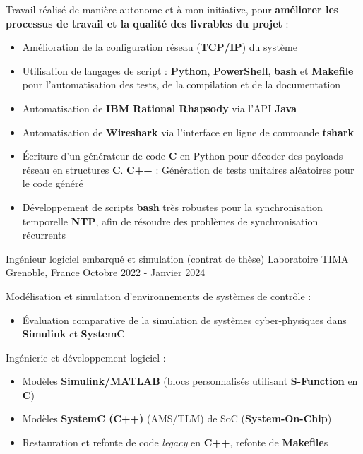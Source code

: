\begin{cventries}
{\begin{cvitems}
{		}
		\item{
			Travail réalisé de manière autonome et à mon initiative, pour \textbf{améliorer les processus de travail et la qualité des livrables du projet} :
			\begin{itemize}
				\item{Amélioration de la configuration réseau (\textbf{TCP/IP}) du système}
				\item{Utilisation de langages de script : \textbf{Python}, \textbf{PowerShell}, \textbf{bash} et \textbf{Makefile} pour l'automatisation des tests, de la compilation et de la documentation}
				\item{Automatisation de \textbf{IBM Rational Rhapsody} via l'API \textbf{Java}}
				\item{Automatisation de \textbf{Wireshark} via l'interface en ligne de commande \textbf{tshark}}
				\item{Écriture d'un générateur de code \textbf{C} en Python pour décoder des payloads réseau en structures \textbf{C}. \textbf{C++} : Génération de tests unitaires aléatoires pour le code généré}	
				\item{Développement de scripts \textbf{bash} très robustes pour la synchronisation temporelle \textbf{NTP}, afin de résoudre des problèmes de synchronisation récurrents}
			\end{itemize}
		}
		\end{cvitems}
	}

	\cventry
	{Ingénieur logiciel embarqué et simulation (contrat de thèse)} %
	{Laboratoire TIMA} %
	{Grenoble, France} %
	{Octobre 2022 - Janvier 2024} %
	{
		\begin{cvitems} %
		\item{
			Modélisation et simulation d'environnements de systèmes de contrôle :
			\begin{itemize}
				\item{Évaluation comparative de la simulation de systèmes cyber-physiques dans \textbf{Simulink} et \textbf{SystemC}}
			\end{itemize}
		}
		\item{
			Ingénierie et développement logiciel :
			\begin{itemize}
				\item{Modèles \textbf{Simulink/MATLAB} (blocs personnalisés utilisant \textbf{S-Function} en \textbf{C})}
				\item{Modèles \textbf{SystemC (C++)} (AMS/TLM) de SoC (\textbf{System-On-Chip})}
				\item{Restauration et refonte de code \emph{legacy} en \textbf{C++}, refonte de \textbf{Makefile}s}
			\end{itemize}
		}
		\end{cvitems}
	}


\end{cventries}
